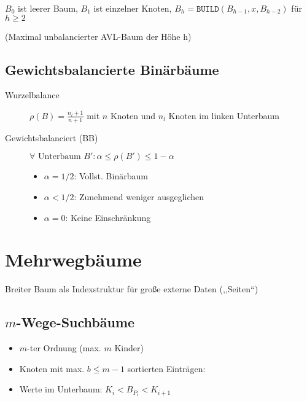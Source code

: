 $B_0$ ist leerer Baum, $B_1$ ist einzelner Knoten, $B_h = \texttt{BUILD}(B_{h-1}, x, B_{h-2})$ für $h \geq 2$

(Maximal unbalancierter AVL-Baum der Höhe h)

\subsection{Gewichtsbalancierte Binärbäume}

\begin{description}
  \item[Wurzelbalance]
    $\rho (B) = \frac{n_l + 1}{n + 1}$ mit $n$ Knoten und $n_l$ Knoten im linken Unterbaum

  \item [Gewichtsbalanciert (BB)] $\forall \text{ Unterbaum } B': \alpha \leq \rho(B') \leq 1 - \alpha$

        \begin{itemize}
          \item $\alpha = 1/2$: Vollst. Binärbaum
          \item $\alpha < 1/2$: Zunehmend weniger ausgeglichen
          \item $\alpha = 0$: Keine Einschränkung
        \end{itemize}
\end{description}


\section{Mehrwegbäume}

Breiter Baum als Indexstruktur für gro\ss e externe Daten (,,Seiten``)

\subsection{$m$-Wege-Suchbäume}

\begin{itemize}
  \item $m$-ter Ordnung (max. $m$ Kinder)
  \item Knoten mit max. $b \leq m - 1$ sortierten Einträgen:
  \item Werte im Unterbaum: $K_i < B_{P_i} < K_{i + 1}$
\end{itemize}

